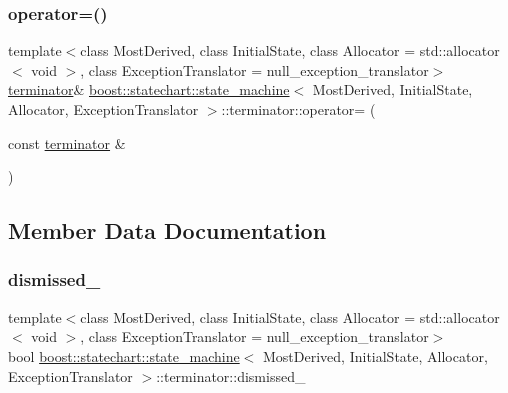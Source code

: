 \subsubsection{\texorpdfstring{operator=()}{operator=()}}
{\footnotesize\ttfamily template$<$class Most\+Derived, class Initial\+State, class Allocator = std\+::allocator$<$ void $>$, class Exception\+Translator = null\+\_\+exception\+\_\+translator$>$ \\
\mbox{\hyperlink{classboost_1_1statechart_1_1state__machine_1_1terminator}{terminator}}\& \mbox{\hyperlink{classboost_1_1statechart_1_1state__machine}{boost\+::statechart\+::state\+\_\+machine}}$<$ Most\+Derived, Initial\+State, Allocator, Exception\+Translator $>$\+::terminator\+::operator= (\begin{DoxyParamCaption}\item[{const \mbox{\hyperlink{classboost_1_1statechart_1_1state__machine_1_1terminator}{terminator}} \&}]{ }\end{DoxyParamCaption})\hspace{0.3cm}{\ttfamily [private]}}



\subsection{Member Data Documentation}
\mbox{\label{classboost_1_1statechart_1_1state__machine_1_1terminator_a55b3acd38cd807904ef015fbf29fcc63}} 
\subsubsection{\texorpdfstring{dismissed\+\_\+}{dismissed\_}}
{\footnotesize\ttfamily template$<$class Most\+Derived, class Initial\+State, class Allocator = std\+::allocator$<$ void $>$, class Exception\+Translator = null\+\_\+exception\+\_\+translator$>$ \\
bool \mbox{\hyperlink{classboost_1_1statechart_1_1state__machine}{boost\+::statechart\+::state\+\_\+machine}}$<$ Most\+Derived, Initial\+State, Allocator, Exception\+Translator $>$\+::terminator\+::dismissed\+\_\+\hspace{0.3cm}{\ttfamily [private]}}

